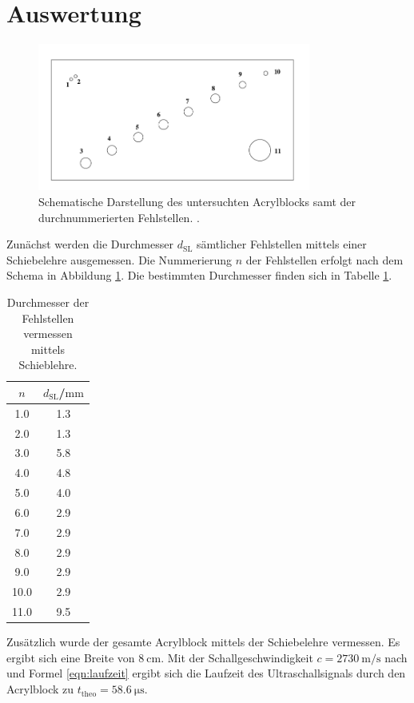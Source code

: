 \section{Auswertung}
\label{sec:Auswertung}
\begin{figure}
  \centering
  \includegraphics[width=0.8\textwidth]{Bilder/fehlstellen.png}
  \caption{Schematische Darstellung des untersuchten Acrylblocks samt der durchnummerierten Fehlstellen. \cite{Anleitung}.}
  \label{fig:fehlstellen}
\end{figure}
Zunächst werden die Durchmesser $d_\mathrm{SL}$ sämtlicher Fehlstellen mittels einer Schiebelehre ausgemessen. Die Nummerierung $n$ der Fehlstellen erfolgt nach dem Schema in Abbildung \ref{fig:fehlstellen}. Die bestimmten Durchmesser finden sich in Tabelle \ref{tab:fehlstellen}.
\begin{table}
  \centering
	\caption{Durchmesser der Fehlstellen vermessen mittels Schieblehre.}
	\label{tab:fehlstellen}
	\begin{tabular}{cc}
		\toprule
    $n$ & $d_\mathrm{SL}$/$\si{\milli\meter}$ \\
		\midrule
1.0 & 1.3 \\
2.0 & 1.3 \\
3.0 & 5.8 \\
4.0 & 4.8 \\
5.0 & 4.0 \\
6.0 & 2.9 \\
7.0 & 2.9 \\
8.0 & 2.9 \\
9.0 & 2.9 \\
10.0 & 2.9 \\
11.0 & 9.5 \\
\bottomrule
\end{tabular}
\end{table}
Zusätzlich wurde der gesamte Acrylblock mittels der Schiebelehre vermessen. Es ergibt sich eine Breite von ${\SI{8}{\centi\meter}}$. Mit der Schallgeschwindigkeit ${c=\SI{2730}{\meter\per\second}}$ nach \cite{schall} und Formel \eqref{eqn:laufzeit} ergibt sich die Laufzeit des Ultraschallsignals durch den Acrylblock zu ${t_{\mathrm{theo}}=\SI{58.6}{\micro\second}}$.
